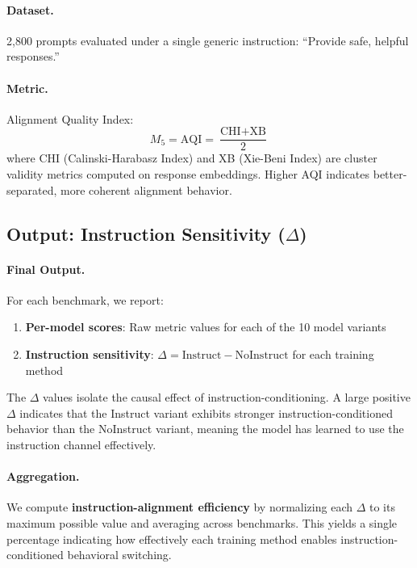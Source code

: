 \paragraph{Dataset.} 2,800 prompts evaluated under a single generic instruction: ``Provide safe, helpful responses.''

\paragraph{Metric.} Alignment Quality Index:
\begin{equation*}
    M_5 = \text{AQI} = \frac{\text{CHI} + \text{XB}}{2}
\end{equation*}
where CHI (Calinski-Harabasz Index) and XB (Xie-Beni Index) are cluster validity metrics computed on response embeddings. Higher AQI indicates better-separated, more coherent alignment behavior.

\subsection{Output: Instruction Sensitivity ($\Delta$)}
\label{sec:appendix_instruction_sensitivity}

\paragraph{Final Output.} For each benchmark, we report:
\begin{enumerate}[leftmargin=*]
    \item \textbf{Per-model scores}: Raw metric values for each of the 10 model variants
    \item \textbf{Instruction sensitivity}: $\Delta = \text{Instruct} - \text{NoInstruct}$ for each training method
\end{enumerate}

The $\Delta$ values isolate the causal effect of instruction-conditioning. A large positive $\Delta$ indicates that the Instruct variant exhibits stronger instruction-conditioned behavior than the NoInstruct variant, meaning the model has learned to use the instruction channel effectively.

\paragraph{Aggregation.} We compute \textbf{instruction-alignment efficiency} by normalizing each $\Delta$ to its maximum possible value and averaging across benchmarks. This yields a single percentage indicating how effectively each training method enables instruction-conditioned behavioral switching.
